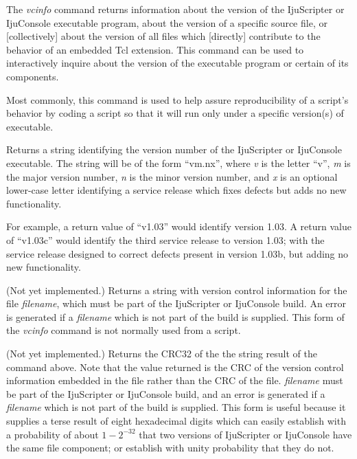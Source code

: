 \begin{tclcommanddescription}
The \emph{vcinfo} command returns information about the version of the
IjuScripter or IjuConsole executable program, about the version of
a specific source file, or [collectively] about the version of all files
which [directly] contribute to the behavior of an embedded Tcl extension.
This command can be used to interactively
inquire about the version of the executable program or certain of its
components.

Most commonly, this command is used to help assure reproducibility
of a script's behavior by coding a script so that it will
run only under a specific version(s) of executable.

\begin{tclcommandinternaldescription}{}
Returns a string identifying the version number of the IjuScripter or IjuConsole
executable.  The string will be of the form ``vm.nx'', where \emph{v} is the letter
``v'', \emph{m} is the major version number, \emph{n} is the minor version number, and 
\emph{x} is an optional lower-case letter identifying a service release which fixes defects
but adds no new functionality.

For example, a return value of ``v1.03'' would identify version 1.03.  A return
value of ``v1.03c'' would identify the third service release to version 1.03; with
the service release designed to correct defects present in version 1.03b, but adding
no new functionality.
\end{tclcommandinternaldescription}

\begin{tclcommandinternaldescription}{}
(Not yet implemented.)  Returns a string with version control information for the file 
\emph{filename}, which must be part of the IjuScripter or IjuConsole build.
An error is generated if a \emph{filename} which is not part of the build
is supplied.  This form of the \emph{vcinfo} command is not normally used from a script.
\end{tclcommandinternaldescription}

\begin{tclcommandinternaldescription}{}
(Not yet implemented.)  Returns the CRC32 of the the string result of the command above.  
Note that the value returned is the CRC of the version control information embedded in the file
rather than the CRC of the file.
\emph{filename} must be part of the IjuScripter or IjuConsole build, and 
an error is generated if a \emph{filename} which is not part of the build is supplied.
This form is
useful because it supplies a terse result of eight hexadecimal digits which can easily
establish with a probability of about $1-2^{-32}$ that two versions of IjuScripter or IjuConsole
have the same file component; or establish with unity probability that they do not.
\end{tclcommandinternaldescription}


\end{tclcommanddescription}
